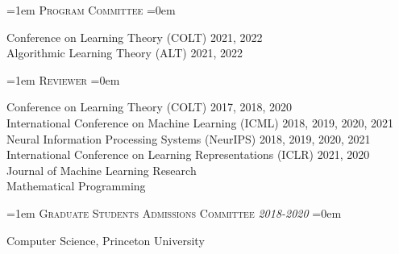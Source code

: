 \documentclass{scrartcl}
\newcommand{\NewEntry}[3]{\noindent\hangindent=1em\hangafter=0 #2 \hfill \textit{#1}  #3 
\vspace{0.5em}}
\newcommand{\Description}[1]{\hangindent=0em\hangafter=0\noindent\raggedright {#1}\par\normalsize\vspace{1em}}
\newcommand{\spacedlowallcaps}[1]{{\Large\textls[80]{\scshape \MakeTextLowercase{#1}}}}
\begin{document}
\begin{cv}{}
\vspace{0.5em}

\noindent\spacedlowallcaps{Service}

\hspace{0.5em}

\NewEntry{}{\textsc{\color{Maroon} Program Committee}}

\vspace{-0.2em}\hspace{0.8em}
\Description{Conference on Learning Theory (COLT) 2021, 2022\\
\hspace{1em}Algorithmic Learning Theory (ALT) 2021, 2022}

\NewEntry{}{\textsc{\color{Maroon} Reviewer}}

\vspace{-0.2em}\hspace{0.8em}
\Description{Conference on Learning Theory (COLT) 2017, 2018, 2020 \\
\hspace{1em}International Conference on Machine Learning (ICML) 2018, 2019, 2020, 2021\\
\hspace{1em}Neural Information Processing Systems (NeurIPS) 2018, 2019, 2020, 2021\\
\hspace{1em}International Conference on Learning Representations (ICLR) 2021, 2020\\
\hspace{1em}Journal of Machine Learning Research\\
\hspace{1em}Mathematical Programming 
}

\NewEntry{2018-2020}{\textsc{\color{Maroon} Graduate Students Admissions Committee}}

\vspace{-0.2em}\hspace{0.8em}
\Description{Computer Science, Princeton University}

\end{cv}
\end{document}
